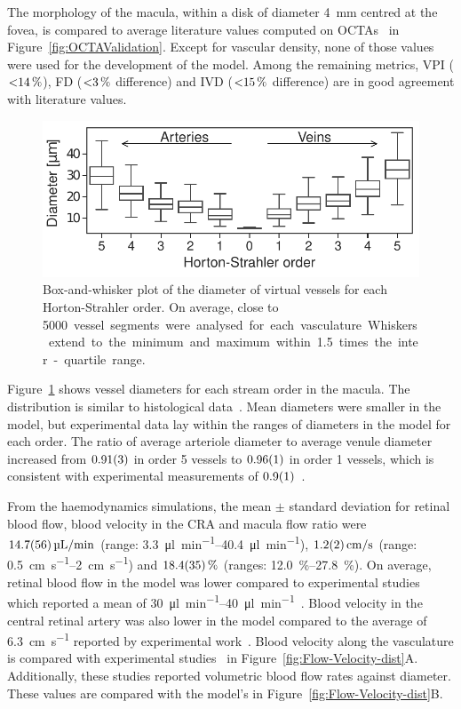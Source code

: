 \documentclass[11pt,]{article}
\begin{document}
The morphology of the macula, within a disk of diameter \SI{4}{\mm} centred at the fovea, is compared to average literature values computed on OCTAs~\cite{Chu2016,Liu_2021,Ma2021} in Figure~\ref{fig:OCTAValidation}.
Except for vascular density, none of those values were used for the development of the model.
Among the remaining metrics, VPI ($\SI{<14}{\percent}$), FD ($\SI{<3}{\percent}$ difference) and IVD ($\SI{<15}{\percent}$ difference) are in good agreement with literature values.

\begin{figure}[ht!]
  \centering
  \includegraphics[width=.95\textwidth]{Horton_Strahler_Diameter_Distribution}
  \caption{\label{fig:Horton_Strahler}Box-and-whisker plot of the diameter of virtual vessels for each Horton-Strahler order. On average, close to \SI{5000} vessel segments were analysed for each vasculature. Whiskers extend to the minimum and maximum within \SI{1.5}{} times the inter-quartile range.}  
\end{figure}

Figure~\ref{fig:Horton_Strahler} shows vessel diameters for each stream order in the macula.
The distribution is similar to histological data~\cite{An2020}.
Mean diameters were smaller in the model, but experimental data lay within the ranges of diameters in the model for each order.
The ratio of average arteriole diameter to average venule diameter increased from $\SI{0.91\pm 0.03}{}$
in order 5 vessels to $\SI{0.96\pm0.01}{}$ in order 1 vessels, which is consistent with experimental measurements of $\SI{0.9\pm0.1}{}$~\cite{Goldenberg2013}.  

From the haemodynamics simulations, the mean $\pm$ standard deviation for retinal blood flow, blood velocity in the CRA and macula flow ratio were $\SI[per-mode=symbol]{14.7 \pm 5.6}{\micro\litre\per\minute}$ (range: \SIrange[per-mode=symbol]{3.3}{40.4}{\micro\litre\per\minute}), $\SI[per-mode=symbol]{1.2 \pm 0.2}{\cm\per\second}$ (range: \SIrange[per-mode=symbol]{0.5}{2}{\cm\per\second}) and $\SI{18.4 \pm 3.5}{\percent}$ (ranges: \SIrange{12.0}{27.8}{\percent}).
On average, retinal blood flow in the model was lower compared to experimental studies which reported a mean of \SIrange{30}{40}{\micro\litre\per\minute}~\cite{DoblhoffDier2014,Riva1985}.
Blood velocity in the central retinal artery was also lower in the model compared to the average of \SI{6.3}{\cm\per\second} reported by experimental work~\cite{Dorner2009}.
Blood velocity along the vasculature is compared with experimental studies~\cite{DoblhoffDier2014,Riva1985} in Figure~\ref{fig:Flow-Velocity-dist}A.
Additionally, these studies reported volumetric blood flow rates against diameter. These values are compared with the model's in Figure~\ref{fig:Flow-Velocity-dist}B. 
\end{document}
